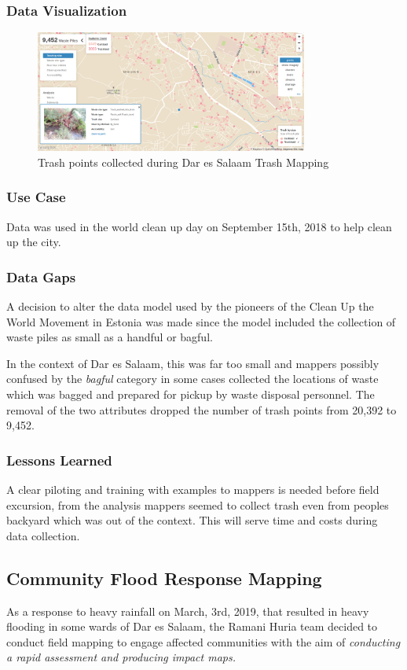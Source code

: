 \documentclass[a4paper,12pt,twoside]{article}
\begin{document}
\subsubsection{Data Visualization}
\begin{figure}[h]
  \color{RHgreen}\caption{Trash points collected during Dar es Salaam Trash Mapping}
  \centering
 \includegraphics[width=0.8\textwidth]{images/dar_trash.png}
\end{figure}

\subsubsection{Use Case}
Data was used in the world clean up day on  September 15th, 2018 to help clean up the city.

\subsubsection{Data Gaps}
A decision to alter the data model used by the pioneers of the Clean Up the World Movement in Estonia was made since the model included the collection of waste piles as small as a handful or bagful.

In the context of Dar es Salaam, this was far too small and mappers possibly confused by the \textit{bagful} category in some cases collected the locations of waste which was bagged and prepared for pickup by waste disposal personnel. The removal of the two attributes dropped the number of trash points from 20,392 to 9,452.

\subsubsection{Lessons Learned}
A clear piloting and training with examples to mappers is needed before field excursion, from the analysis mappers seemed to collect trash even from peoples backyard which was out of the context. This will serve time and costs during data collection.

\newpage
\subsection{Community Flood Response Mapping}
As a response to heavy rainfall on March, 3rd, 2019, that resulted in heavy flooding in some wards of Dar es Salaam, the Ramani Huria team decided to conduct field mapping to engage affected communities with the aim of \textit{conducting a rapid assessment and producing impact maps.}
\end{document}
